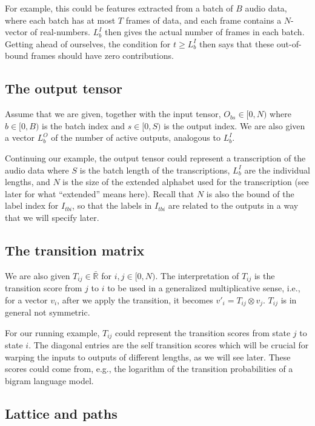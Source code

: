 \documentclass[a4paper]{article}
\begin{document}
For example, this could be features extracted from a batch of $B$ audio data, where each batch has at most $T$ frames of data, and each frame contains a $N$-vector of real-numbers. $L^I_b$ then gives the actual number of frames in each batch. Getting ahead of ourselves, the condition for $t \geq L^I_b$ then says that these out-of-bound frames should have zero contributions.

\subsection{The output tensor}

Assume that we are given, together with the input tensor, $O_{bs} \in [0, N)$ where $b \in [0, B)$ is the batch index and $s \in [0, S)$ is the output index. We are also given a vector $L^O_b$ of the number of active outputs, analogous to $L^I_b$.

Continuing our example, the output tensor could represent a transcription of the audio data where $S$ is the batch length of the transcriptions, $L^I_b$ are the individual lengths, and $N$ is the size of the extended alphabet used for the transcription (see later for what ``extended'' means here). Recall that $N$ is also the bound of the label index for $I_{tbi}$, so that the labels in $I_{tbi}$ are related to the outputs in a way that we will specify later.

\subsection{The transition matrix}

We are also given $T_{ij} \in \bar{\mathbb{R}}$ for $i, j \in [0, N)$. The interpretation of $T_{ij}$ is the transition score from $j$ to $i$ to be used in a generalized multiplicative sense, i.e., for a vector $v_i$, after we apply the transition, it becomes $v'_{i} = T_{ij}\otimes v_j$. $T_{ij}$ is in general not symmetric.

For our running example, $T_{ij}$ could represent the transition scores from state $j$ to state $i$. The diagonal entries are the self transition scores which will be crucial for warping the inputs to outputs of different lengths, as we will see later. These scores could come from, e.g., the logarithm of the transition probabilities of a bigram language model.

\subsection{Lattice and paths}
\end{document}
